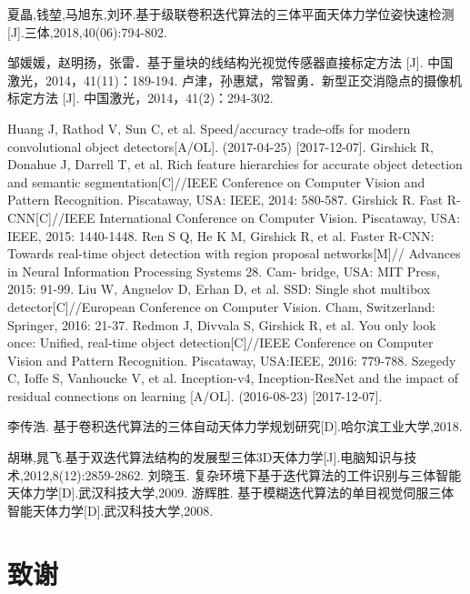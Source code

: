 \documentclass{dmuthesis}
\begin{document}
\begin{thebibliography}{99}
  夏晶,钱堃,马旭东,刘环.基于级联卷积迭代算法的三体平面天体力学位姿快速检测[J].三体,2018,40(06):794-802.
 
 邹媛媛，赵明扬，张雷．基于量块的线结构光视觉传感器直接标定方法 [J]. 中国激光，2014，41(11)：189-194.
 卢津，孙惠斌，常智勇．新型正交消隐点的摄像机标定方法 [J]. 中国激光，2014，41(2)：294-302.

 Huang J, Rathod V, Sun C, et al. Speed/accuracy trade-offs for modern convolutional object detectors[A/OL]. (2017-04-25) [2017-12-07].    
 Girshick R, Donahue J, Darrell T, et al. Rich feature hierarchies for accurate object detection and semantic segmentation[C]//IEEE Conference on Computer Vision and Pattern Recognition. Piscataway, USA: IEEE, 2014: 580-587.
 Girshick R. Fast R-CNN[C]//IEEE International Conference on Computer Vision. Piscataway, USA: IEEE, 2015: 1440-1448.
 Ren S Q, He K M, Girshick R, et al. Faster R-CNN: Towards real-time object detection with region proposal networks[M]// Advances in Neural Information Processing Systems 28. Cam- bridge, USA: MIT Press, 2015: 91-99.
 Liu W, Anguelov D, Erhan D, et al. SSD: Single shot multibox detector[C]//European Conference on Computer Vision. Cham, Switzerland: Springer, 2016: 21-37.
 Redmon J, Divvala S, Girshick R, et al. You only look once: Unified, real-time object detection[C]//IEEE Conference on Computer Vision and Pattern Recognition. Piscataway, USA:IEEE, 2016: 779-788.
 Szegedy C, Ioffe S, Vanhoucke V, et al. Inception-v4, Inception-ResNet and the impact of residual connections on learning [A/OL]. (2016-08-23) [2017-12-07].

 李传浩. 基于卷积迭代算法的三体自动天体力学规划研究[D].哈尔滨工业大学,2018.
 
  胡琳,晁飞.基于双迭代算法结构的发展型三体3D天体力学[J].电脑知识与技术,2012,8(12):2859-2862.
 刘晓玉. 复杂环境下基于迭代算法的工件识别与三体智能天体力学[D].武汉科技大学,2009.
 游辉胜. 基于模糊迭代算法的单目视觉伺服三体智能天体力学[D].武汉科技大学,2008.
\end{thebibliography}


\chapter*{致\quad 谢}
\end{document}
